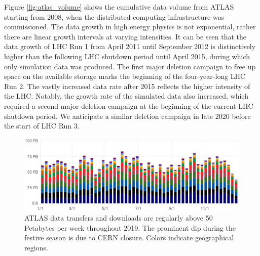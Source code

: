 \documentclass[11pt]{article}
\begin{document}
Figure \ref{fig:atlas_volume} shows the cumulative data volume from ATLAS starting from 2008, when the distributed computing infrastructure was commissioned. The data growth in high energy physics is not exponential, rather there are linear growth intervals at varying intensities. It can be seen that the data growth of LHC Run 1 from April 2011 until September 2012 is distinctively higher than the following LHC shutdown period until April 2015, during which only simulation data was produced. The first major deletion campaign to free up space on the available storage marks the beginning of the four-year-long LHC Run 2. The vastly increased data rate after 2015 reflects the higher intensity of the LHC. Notably, the growth rate of the simulated data also increased, which required a second major deletion campaign at the beginning of the current LHC shutdown period. We anticipate a similar deletion campaign in late 2020 before the start of LHC Run 3.

\begin{figure}[t]
        \centering
        \includegraphics[width=\textwidth]{figs/ATLAS_Flow.png}
        \caption{ATLAS data transfers and downloads are regularly above 50 Petabytes per week throughout 2019. The prominent dip during the festive season is due to CERN closure. Colors indicate geographical regions.}
        \label{fig:atlas_transfer_rate}
\end{figure}
\end{document}
